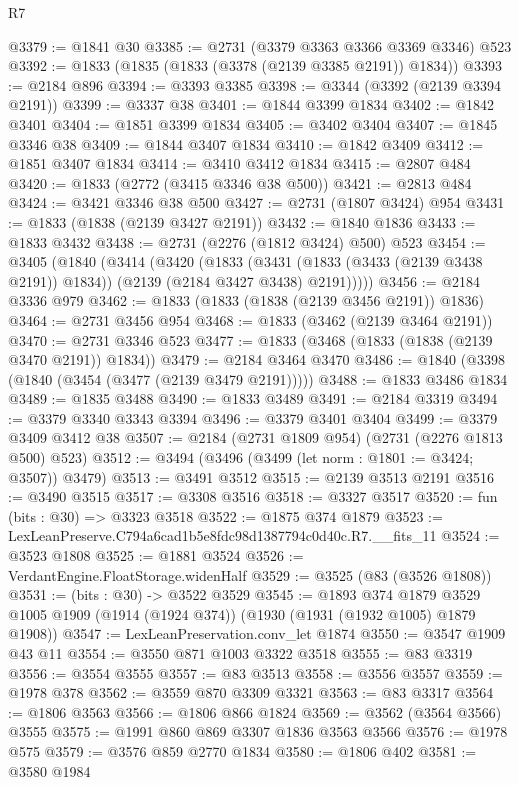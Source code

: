 \begin{lexlean}{R7}
\begin{coremodule}
@3379 := @1841 @30
@3385 := @2731 (@3379 @3363 @3366 @3369 @3346) @523
@3392 := @1833 (@1835 (@1833 (@3378 (@2139 @3385 @2191)) @1834))
@3393 := @2184 @896
@3394 := @3393 @3385
@3398 := @3344 (@3392 (@2139 @3394 @2191))
@3399 := @3337 @38
@3401 := @1844 @3399 @1834
@3402 := @1842 @3401
@3404 := @1851 @3399 @1834
@3405 := @3402 @3404
@3407 := @1845 @3346 @38
@3409 := @1844 @3407 @1834
@3410 := @1842 @3409
@3412 := @1851 @3407 @1834
@3414 := @3410 @3412 @1834
@3415 := @2807 @484
@3420 := @1833 (@2772 (@3415 @3346 @38 @500))
@3421 := @2813 @484
@3424 := @3421 @3346 @38 @500
@3427 := @2731 (@1807 @3424) @954
@3431 := @1833 (@1838 (@2139 @3427 @2191))
@3432 := @1840 @1836
@3433 := @1833 @3432
@3438 := @2731 (@2276 (@1812 @3424) @500) @523
@3454 := @3405
    (@1840
      (@3414
        (@3420
          (@1833
            (@3431 (@1833 (@3433 (@2139 @3438 @2191)) @1834))
            (@2139 (@2184 @3427 @3438) @2191)))))
@3456 := @2184 @3336 @979
@3462 := @1833 (@1833 (@1838 (@2139 @3456 @2191)) @1836)
@3464 := @2731 @3456 @954
@3468 := @1833 (@3462 (@2139 @3464 @2191))
@3470 := @2731 @3346 @523
@3477 := @1833 (@3468 (@1833 (@1838 (@2139 @3470 @2191)) @1834))
@3479 := @2184 @3464 @3470
@3486 := @1840 (@3398 (@1840 (@3454 (@3477 (@2139 @3479 @2191)))))
@3488 := @1833 @3486 @1834
@3489 := @1835 @3488
@3490 := @1833 @3489
@3491 := @2184 @3319
@3494 := @3379 @3340 @3343 @3394
@3496 := @3379 @3401 @3404
@3499 := @3379 @3409 @3412 @38
@3507 := @2184 (@2731 @1809 @954) (@2731 (@2276 @1813 @500) @523)
@3512 := @3494 (@3496 (@3499 (let norm : @1801 := @3424; @3507)) @3479)
@3513 := @3491 @3512
@3515 := @2139 @3513 @2191
@3516 := @3490 @3515
@3517 := @3308 @3516
@3518 := @3327 @3517
@3520 := fun (bits : @30) => @3323 @3518
@3522 := @1875 @374 @1879
@3523 := LexLeanPreserve.C794a6cad1b5e8fdc98d1387794c0d40c.R7.__fits_11
@3524 := @3523 @1808
@3525 := @1881 @3524
@3526 := VerdantEngine.FloatStorage.widenHalf
@3529 := @3525 (@83 (@3526 @1808))
@3531 := (bits : @30) -> @3522 @3529
@3545 := @1893
    @374
    @1879
    @3529
    @1005
    @1909
    (@1914 (@1924 @374))
    (@1930 (@1931 (@1932 @1005) @1879 @1908))
@3547 := LexLeanPreservation.conv_let @1874
@3550 := @3547 @1909 @43 @11
@3554 := @3550 @871 @1003 @3322 @3518
@3555 := @83 @3319
@3556 := @3554 @3555
@3557 := @83 @3513
@3558 := @3556 @3557
@3559 := @1978 @378
@3562 := @3559 @870 @3309 @3321
@3563 := @83 @3317
@3564 := @1806 @3563
@3566 := @1806 @866 @1824
@3569 := @3562 (@3564 @3566) @3555
@3575 := @1991 @860 @869 @3307 @1836 @3563 @3566
@3576 := @1978 @575
@3579 := @3576 @859 @2770 @1834
@3580 := @1806 @402
@3581 := @3580 @1984

\end{coremodule}
\end{lexlean}
